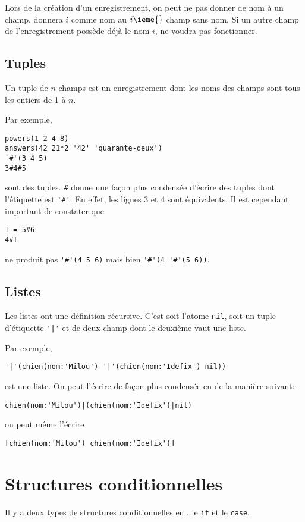 Lors de la création d'un enregistrement,
on peut ne pas donner de nom à un champ.
\oz{} donnera $i$ comme nom au $i\ieme{}$ champ sans nom.
Si un autre champ de l'enregistrement possède déjà le nom $i$, \oz{} ne voudra pas fonctionner.

\subsection{Tuples}
Un tuple de $n$ champs est un enregistrement dont les noms des champs sont tous les entiers de
1 à $n$.

Par exemple,
\begin{lstlisting}
powers(1 2 4 8)
answers(42 21*2 '42' 'quarante-deux')
'#'(3 4 5)
3#4#5
\end{lstlisting}
sont des tuples.
\lstinline|#| donne une façon plus condensée d'écrire des tuples
dont l'étiquette est \lstinline|'#'|.
En effet, les lignes 3 et 4 sont équivalents.
Il est cependant important de constater que
\begin{lstlisting}
T = 5#6
4#T
\end{lstlisting}
ne produit pas \lstinline|'#'(4 5 6)| mais bien \lstinline|'#'(4 '#'(5 6))|.

\subsection{Listes}
Les listes ont une définition récursive.
C'est soit l'atome \lstinline|nil|,
soit un tuple d'étiquette \lstinline$'|'$ et de deux champ dont le
deuxième vaut une liste.

Par exemple,
\begin{lstlisting}
'|'(chien(nom:'Milou') '|'(chien(nom:'Idefix') nil))
\end{lstlisting}
est une liste.
On peut l'écrire de façon plus condensée en \oz{} de la manière suivante
\begin{lstlisting}
chien(nom:'Milou')|(chien(nom:'Idefix')|nil)
\end{lstlisting}
on peut même l'écrire
\begin{lstlisting}
[chien(nom:'Milou') chien(nom:'Idefix')]
\end{lstlisting}

\section{Structures conditionnelles}
%
Il y a deux types de structures conditionnelles en \oz{},
le \lstinline|if| et le \lstinline|case|.

